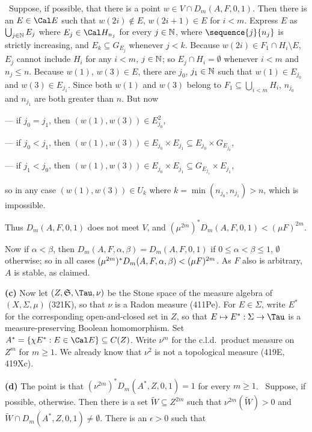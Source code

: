 {\noindent\Quer\ Suppose, if possible, that there is a point
$w\in V\cap D_m(A,F,0,1)$.   Then there is an $E\in\Cal E$ such that
$w(2i)\notin E$, $w(2i+1)\in E$ for $i<m$.   Express $E$ as
$\bigcup_{j\in\Bbb N}E_j$
where $E_j\in\Cal H_{n_j}$ for every $j\in\Bbb N$, where
$\sequence{j}{n_j}$ is strictly increasing, and $E_k\subseteq G_{E_j}$
whenever $j<k$.   Because $w(2i)\in F_1\cap H_i\setminus E$, $E_j$
cannot include $H_i$ for any $i<m$, $j\in\Bbb N$;  so
$E_j\cap H_i=\emptyset$ whenever $i<m$ and $n_j\le n$.
Because $w(1)$, $w(3)\in E$, there are $j_0$, $j_1\in\Bbb N$ such that
$w(1)\in E_{j_0}$ and $w(3)\in E_{j_1}$.   Since both $w(1)$ and $w(3)$
belong to $F_1\subseteq\bigcup_{i<m}H_i$, $n_{j_0}$ and $n_{j_1}$ are
both greater than $n$.   But now

--- if $j_0=j_1$, then $(w(1),w(3))\in E_{j_0}^2$,

--- if $j_0<j_1$, then $(w(1),w(3))\in E_{j_0}\times E_{j_1}
\subseteq E_{j_0}\times G_{E_{j_0}}$,

--- if $j_1<j_0$, then $(w(1),w(3))\in E_{j_0}\times E_{j_1}
\subseteq G_{E_{j_1}}\times E_{j_1}$,

\noindent so in any case $(w(1),w(3))\in U_k$ where
$k=\min(n_{j_0},n_{j_1})>n$,
which is impossible.\ \Bang

Thus $D_m(A,F,0,1)$ does not meet $V$, and
$(\mu^{2m})^*D_m(A,F,0,1)<(\mu F)^{2m}$.

Now if $\alpha<\beta$, then
$D_m(A,F,\alpha,\beta)=D_m(A,F,0,1)$ if $0\le\alpha<\beta\le 1$,
$\emptyset$ otherwise;  so in all cases
$(\mu^{2m})^*D_m(A,F,\alpha,\beta)\penalty-100<(\mu F)^{2m}$.
As $F$ also is arbitrary, $A$ is stable, as claimed.\ \Qed

\medskip

{\bf (c)} Now let $(Z,\frak S,\Tau,\nu)$ be the Stone space of the
measure algebra of
$(X,\Sigma,\mu)$ (321K), so that $\nu$ is a Radon measure (411Pe).   For
$E\in\Sigma$, write $E^*$ for the
corresponding open-and-closed set in $Z$, so that $E\mapsto
E^*:\Sigma\to\Tau$ is a measure-preserving Boolean homomorphism.
Set $A^*=\{\chi E^*:E\in\Cal E\}\subseteq C(Z)$.   Write $\nu^m$ for the
c.l.d.\ product measure on $Z^m$ for $m\ge 1$.   We already know that
$\nu^2$ is not a topological measure (419E, 419Xc).

\medskip

{\bf (d)} The point is that $(\nu^{2m})^*D_m(A^*,Z,0,1)=1$ for every
$m\ge 1$.   \Prf\Quer\ Suppose, if possible, otherwise.   Then there is
a set $\tilde W\subseteq Z^{2m}$ such that $\nu^{2m}(\tilde W)>0$ and
$\tilde W\cap D_m(A^*,Z,0,1)\ne\emptyset$.   There
is an $\epsilon>0$ such that

}

